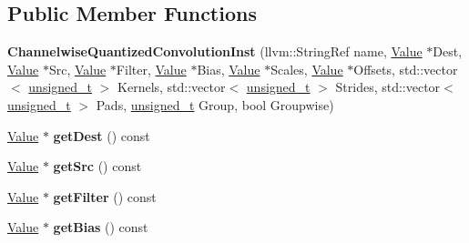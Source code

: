 \subsection*{Public Member Functions}
\begin{DoxyCompactItemize}
\item 
\mbox{\label{classglow_1_1_channelwise_quantized_convolution_inst_aa421fdc4fdb6691eca398557457de1ff}} 
{\bfseries Channelwise\+Quantized\+Convolution\+Inst} (llvm\+::\+String\+Ref name, \hyperlink{classglow_1_1_value}{Value} $\ast$Dest, \hyperlink{classglow_1_1_value}{Value} $\ast$Src, \hyperlink{classglow_1_1_value}{Value} $\ast$Filter, \hyperlink{classglow_1_1_value}{Value} $\ast$Bias, \hyperlink{classglow_1_1_value}{Value} $\ast$Scales, \hyperlink{classglow_1_1_value}{Value} $\ast$Offsets, std\+::vector$<$ \hyperlink{namespaceglow_a0ca574644e1e42ef193a9947fb4d8911}{unsigned\+\_\+t} $>$ Kernels, std\+::vector$<$ \hyperlink{namespaceglow_a0ca574644e1e42ef193a9947fb4d8911}{unsigned\+\_\+t} $>$ Strides, std\+::vector$<$ \hyperlink{namespaceglow_a0ca574644e1e42ef193a9947fb4d8911}{unsigned\+\_\+t} $>$ Pads, \hyperlink{namespaceglow_a0ca574644e1e42ef193a9947fb4d8911}{unsigned\+\_\+t} Group, bool Groupwise)
\item 
\mbox{\label{classglow_1_1_channelwise_quantized_convolution_inst_a7b1b3af056a716c777310cde4a0de30d}} 
\hyperlink{classglow_1_1_value}{Value} $\ast$ {\bfseries get\+Dest} () const
\item 
\mbox{\label{classglow_1_1_channelwise_quantized_convolution_inst_af4f40ddd4eb69ca1f67b671b8391cf2a}} 
\hyperlink{classglow_1_1_value}{Value} $\ast$ {\bfseries get\+Src} () const
\item 
\mbox{\label{classglow_1_1_channelwise_quantized_convolution_inst_a51c9a9e02b31517451dadc6b23640aff}} 
\hyperlink{classglow_1_1_value}{Value} $\ast$ {\bfseries get\+Filter} () const
\item 
\mbox{\label{classglow_1_1_channelwise_quantized_convolution_inst_a73eebcca76ea32be7002b8d6f4a96c51}} 
\hyperlink{classglow_1_1_value}{Value} $\ast$ {\bfseries get\+Bias} () const

\end{DoxyCompactItemize}
